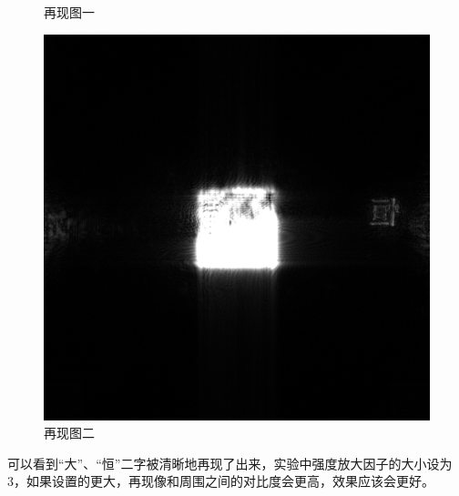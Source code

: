 \documentclass{WHUReport}
\begin{document}
\begin{multicols}{2}
\begin{figure}[H]
		\caption{再现图一}
	\end{figure}
	\begin{figure}[H]
		\centering
		\includegraphics[width=.8\linewidth]{figs/4.png}
		\caption{再现图二}
	\end{figure}
	可以看到“大”、“恒”二字被清晰地再现了出来，实验中强度放大因子的大小设为3，如果设置的更大，再现像和周围之间的对比度会更高，效果应该会更好。

\end{multicols}
\end{document}
